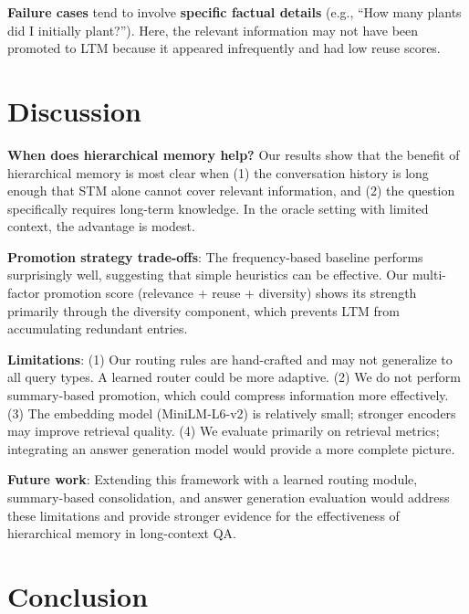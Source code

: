\documentclass{article}
\begin{document}
\textbf{Failure cases} tend to involve \textbf{specific factual details} (e.g., ``How many plants did I initially plant?''). Here, the relevant information may not have been promoted to LTM because it appeared infrequently and had low reuse scores.

\section{Discussion}

\textbf{When does hierarchical memory help?} Our results show that the benefit of hierarchical memory is most clear when (1) the conversation history is long enough that STM alone cannot cover relevant information, and (2) the question specifically requires long-term knowledge. In the oracle setting with limited context, the advantage is modest.

\textbf{Promotion strategy trade-offs}: The frequency-based baseline performs surprisingly well, suggesting that simple heuristics can be effective. Our multi-factor promotion score (relevance + reuse + diversity) shows its strength primarily through the diversity component, which prevents LTM from accumulating redundant entries.

\textbf{Limitations}: (1) Our routing rules are hand-crafted and may not generalize to all query types. A learned router could be more adaptive. (2) We do not perform summary-based promotion, which could compress information more effectively. (3) The embedding model (MiniLM-L6-v2) is relatively small; stronger encoders may improve retrieval quality. (4) We evaluate primarily on retrieval metrics; integrating an answer generation model would provide a more complete picture.

\textbf{Future work}: Extending this framework with a learned routing module, summary-based consolidation, and answer generation evaluation would address these limitations and provide stronger evidence for the effectiveness of hierarchical memory in long-context QA.

\section{Conclusion}
\end{document}
